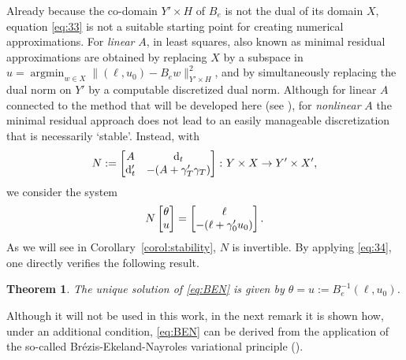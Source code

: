 \documentclass{amsart}
\newtheorem{theorem}{Theorem}[section]
\numberwithin{equation}{section}
\newcommand{\NN}{N}
\DeclareMathOperator*{\argmin}{argmin}
\newcommand{\1}{\mathbb 1}
\newcommand*\diff{\mathop{}\!\mathrm{d}}
\newcommand{\be}{\begin{equation}}
\newcommand{\ee}{\end{equation}}
\begin{document}
Already because the co-domain $Y' \times H$ of $B_e$ is not the dual of its domain $X$, equation \eqref{eq:33} is not a suitable starting point for creating numerical approximations.
For \emph{linear} $A$, in \cite{11,249.99,249.992} least squares, also known as minimal residual approximations are obtained by replacing $X$ by a subspace in 
$u=\argmin_{w \in X} \|(\ell,u_0)-B_ew\|_{Y' \times H}^2$, and by simultaneously replacing the dual norm on $Y'$ by a computable discretized dual norm.
Although for linear $A$ connected to the method that will be developed here (see \cite[Rem.~4.1]{249.992}), 
for \emph{nonlinear} $A$ the minimal residual approach does not lead to an easily manageable discretization that is necessarily `stable'.
Instead, with 
$$
\NN:=\left[\begin{array}{@{}cc@{}} A & \diff_t\\ \diff_t'& -(A+\gamma_T' \gamma_T)\end{array}\right]\colon Y \times X \rightarrow Y' \times X',
$$
we consider the system 
\be \label{eq:BEN}
\NN
\left[\begin{array}{@{}c@{}} \theta \\ u \end{array}\right]=
\left[\begin{array}{@{}c@{}} \ell \\ -(\ell+\gamma_0' u_0) \end{array}\right].
\ee
As we will see in Corollary~\ref{corol:stability}, $N$ is invertible. By applying \eqref{eq:34}, one directly verifies the following result.

\begin{theorem} \label{thm:basic} The unique solution of \eqref{eq:BEN} is given by $\theta=u:=B_e^{-1}(\ell,u_0)$.
\end{theorem}

Although it will not be used in this work, in the next remark it is shown how, under an additional condition, \eqref{eq:BEN} can be derived from the application of the so-called Br\'{e}zis-Ekeland-Nayroles variational principle (\cite{35.81,233.5}).
\end{document}
